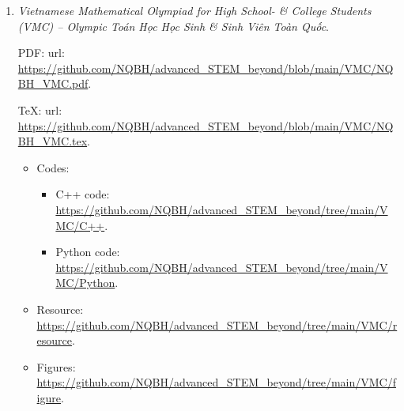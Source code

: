 \documentclass{article}
\begin{document}
\begin{enumerate}
	\item {\it Vietnamese Mathematical Olympiad for High School- \& College Students (VMC) -- Olympic Toán Học Học Sinh \& Sinh Viên Toàn Quốc}.
	
	PDF: {\sc url}: \url{https://github.com/NQBH/advanced_STEM_beyond/blob/main/VMC/NQBH_VMC.pdf}.
	
	\TeX: {\sc url}: \url{https://github.com/NQBH/advanced_STEM_beyond/blob/main/VMC/NQBH_VMC.tex}.
	\begin{itemize}
		\item Codes:
		\begin{itemize}
			\item C++ code: \url{https://github.com/NQBH/advanced_STEM_beyond/tree/main/VMC/C++}.
			\item Python code: \url{https://github.com/NQBH/advanced_STEM_beyond/tree/main/VMC/Python}.
		\end{itemize}
		\item Resource: \url{https://github.com/NQBH/advanced_STEM_beyond/tree/main/VMC/resource}.
		\item Figures: \url{https://github.com/NQBH/advanced_STEM_beyond/tree/main/VMC/figure}.
	\end{itemize}
\end{enumerate}


\printbibliography[heading=bibintoc]
	
\end{document}
